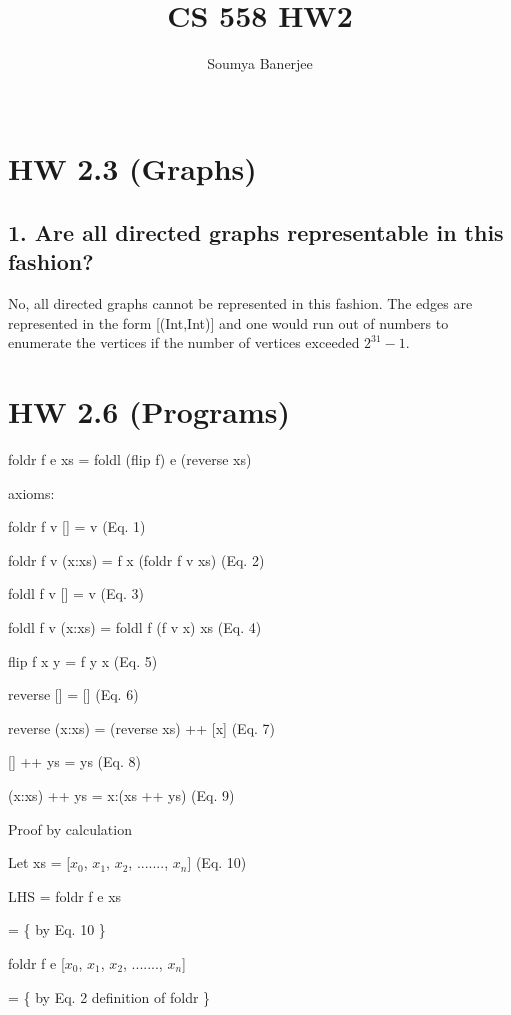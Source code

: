 \documentclass[twocolumn]{article}
\begin{document}
\title{CS 558 HW2}
\author{Soumya Banerjee\\
\\}

\maketitle

\section{HW 2.3 (Graphs)}
\subsection{1. Are all directed graphs representable in this fashion?}

No, all directed graphs cannot be represented in this fashion. The edges are represented in the form [(Int,Int)] and one would run out of numbers to enumerate the vertices if the number of vertices exceeded $2^{31} - 1$.

\section{HW 2.6 (Programs)}


foldr f e xs = foldl (flip f) e (reverse xs)

axioms:


foldr f v [] = v					 (Eq. 1)

foldr f v (x:xs) = f x (foldr f v xs)		 (Eq. 2)

foldl f v [] = v					 (Eq. 3)

foldl f v (x:xs) = foldl f (f v x) xs		 (Eq. 4)


flip f x y = f y x					 (Eq. 5)

reverse [] = []					 (Eq. 6)

reverse (x:xs) = (reverse xs) ++ [x]	 (Eq. 7)

[] ++ ys = ys						(Eq. 8)

(x:xs) ++ ys = x:(xs ++ ys)			(Eq. 9)

Proof by calculation


Let xs = [$x_{0}$, $x_{1}$, $x_{2}$, ......., $x_{n}$]       (Eq. 10)

LHS = foldr f e xs

	= \{ by Eq. 10 \}

	foldr f e [$x_{0}$, $x_{1}$, $x_{2}$, ......., $x_{n}$] 	
	
	= \{ by Eq. 2 definition of foldr \}
	
\end{document}
